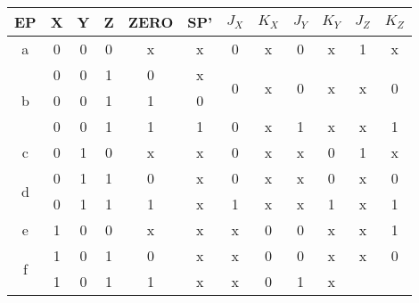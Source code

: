 

\begin{table}[H]
  \centering
  \begin{tabular}{c c c c c c c c c c c c}
    \toprule
    EP & X & Y & Z & ZERO & SP' & $J_X$ & $K_X$   & $J_Y$ & $K_Y$   & $J_Z$ & $K_Z$ \\
    \toprule
    a
       & 0 & 0 & 0 & x & x
       & 0 & x %
       & 0 & x %
       & 1 & x %
       \\
    \cmidrule(r){1-6}      \cmidrule(l){7-8} \cmidrule(l){9-10} \cmidrule(l){11-12}
    \multirow{3}{*}{b}
       & 0 & 0 & 1 & 0 & x
       & \multirow{2}{*}{0} & \multirow{2}{*}{x} %
       & \multirow{2}{*}{0} & \multirow{2}{*}{x} %
       & \multirow{2}{*}{x} & \multirow{2}{*}{0} %
       \\
       & 0 & 0 & 1 & 1 & 0 & & & & & &
       \\
    \cmidrule(r){2-6}      \cmidrule(l){7-8} \cmidrule(l){9-10} \cmidrule(l){11-12}
       & 0 & 0 & 1 & 1 & 1
       & 0 & x %
       & 1 & x %
       & x & 1 %
       \\
    \cmidrule(r){1-6}      \cmidrule(l){7-8} \cmidrule(l){9-10} \cmidrule(l){11-12}
    c
       & 0 & 1 & 0 & x & x
       & 0 & x %
       & x & 0 %
       & 1 & x %
       \\
    \cmidrule(r){1-6}      \cmidrule(l){7-8} \cmidrule(l){9-10} \cmidrule(l){11-12}
    \multirow{2}{*}{d}
       & 0 & 1 & 1 & 0 & x
       & 0 & x %
       & x & 0 %
       & x & 0 %
       \\
    \cmidrule(r){2-6}      \cmidrule(l){7-8} \cmidrule(l){9-10} \cmidrule(l){11-12}
       & 0 & 1 & 1 & 1 & x
       & 1 & x %
       & x & 1 %
       & x & 1 %
       \\
    \cmidrule(r){1-6}      \cmidrule(l){7-8} \cmidrule(l){9-10} \cmidrule(l){11-12}
    e
       & 1 & 0 & 0 & x & x
       & x & 0 %
       & 0 & x %
       & x & 1 %
       \\
    \cmidrule(r){1-6}      \cmidrule(l){7-8} \cmidrule(l){9-10} \cmidrule(l){11-12}
    \multirow{2}{*}{f}
       & 1 & 0 & 1 & 0 & x
       & x & 0 %
       & 0 & x %
       & x & 0 %
       \\
    \cmidrule(r){2-6}      \cmidrule(l){7-8} \cmidrule(l){9-10} \cmidrule(l){11-12}
       & 1 & 0 & 1 & 1 & x
       & x & 0 %
       & 1 & x %

\end{tabular}
\end{table}
